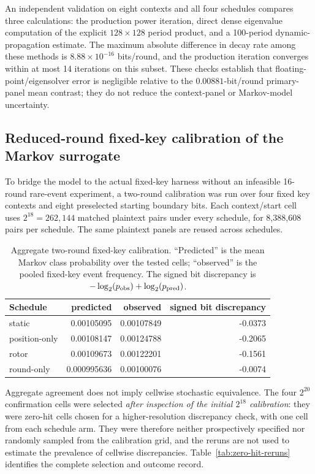 \documentclass[cryptography,supfile,submit,oneauthor]{Definitions/mdpi}
\begin{document}
An independent validation on eight contexts and all four schedules compares three calculations: the production power iteration, direct dense eigenvalue computation of the explicit $128\times128$ period product, and a 100-period dynamic-propagation estimate. The maximum absolute difference in decay rate among these methods is $8.88\times10^{-16}$ bits/round, and the production iteration converges within at most 14 iterations on this subset. These checks establish that floating-point/eigensolver error is negligible relative to the $0.00881$-bit/round primary-panel mean contrast; they do not reduce the context-panel or Markov-model uncertainty.

\subsection{Reduced-round fixed-key calibration of the Markov surrogate}
To bridge the model to the actual fixed-key harness without an infeasible 16-round rare-event experiment, a two-round calibration was run over four fixed key contexts and eight preselected starting boundary bits. Each context/start cell uses $2^{18}=262{,}144$ matched plaintext pairs under every schedule, for 8,388,608 pairs per schedule. The same plaintext panels are reused across schedules.

\begin{table}[h]
\centering\small
\caption{Aggregate two-round fixed-key calibration. ``Predicted'' is the mean Markov class probability over the tested cells; ``observed'' is the pooled fixed-key event frequency. The signed bit discrepancy is $-\log_2(p_{\rm obs})+\log_2(p_{\rm pred})$.}
\begin{tabular}{lrrr}
\toprule
Schedule & predicted & observed & signed bit discrepancy\\
\midrule
static & 0.00105095 & 0.00107849 & -0.0373\\
position-only & 0.00108147 & 0.00124788 & -0.2065\\
rotor & 0.00109673 & 0.00122201 & -0.1561\\
round-only & 0.000995636 & 0.00100076 & -0.0074\\
\bottomrule
\end{tabular}
\end{table}

Aggregate agreement does not imply cellwise stochastic equivalence. The four $2^{20}$ confirmation cells were selected \emph{after inspection of the initial $2^{18}$ calibration}: they were zero-hit cells chosen for a higher-resolution discrepancy check, with one cell from each schedule arm. They were therefore neither prospectively specified nor randomly sampled from the calibration grid, and the reruns are not used to estimate the prevalence of cellwise discrepancies. Table~\ref{tab:zero-hit-reruns} identifies the complete selection and outcome record.
\end{document}
